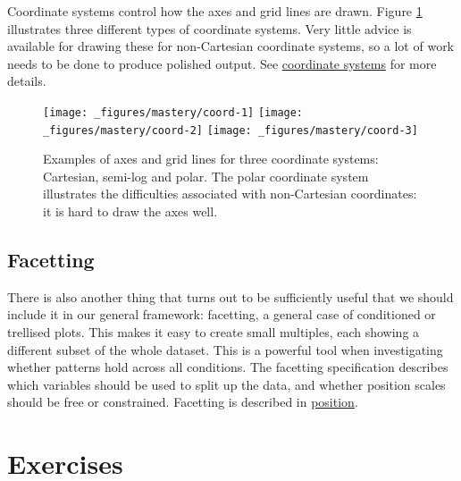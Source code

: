 Coordinate systems control how the axes and grid lines are drawn. Figure
\ref{fig:coord} illustrates three different types of coordinate systems.
Very little advice is available for drawing these for non-Cartesian
coordinate systems, so a lot of work needs to be done to produce
polished output. See \protect\hyperlink{sec:coord}{coordinate systems}
for more details.

\begin{figure}[H]
  \texttt{[image: \_figures/mastery/coord-1]}%
  \texttt{[image: \_figures/mastery/coord-2]}%
  \texttt{[image: \_figures/mastery/coord-3]}
  \caption{Examples of axes and grid lines for three coordinate systems: Cartesian, semi-log and polar. The polar coordinate system illustrates the difficulties associated with non-Cartesian coordinates: it is hard to draw the axes well.}
  \label{fig:coord}
\end{figure}

\subsection{Facetting}\label{sub:intro-facetting}

There is also another thing that turns out to be sufficiently useful
that we should include it in our general framework: facetting, a general
case of conditioned or trellised plots. This makes it easy to create
small multiples, each showing a different subset of the whole dataset.
This is a powerful tool when investigating whether patterns hold across
all conditions. The facetting specification describes which variables
should be used to split up the data, and whether position scales should
be free or constrained. Facetting is described in
\protect\hyperlink{cha:position}{position}.

\section{Exercises}\label{exercises}

